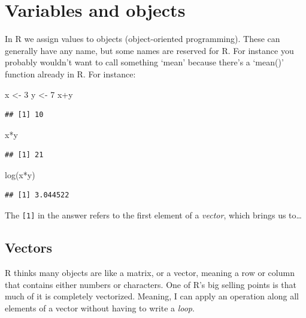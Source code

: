 \documentclass[
]{book}
\newenvironment{Shaded}{\begin{snugshade}}{\end{snugshade}}
\newcommand{\DecValTok}[1]{\textcolor[rgb]{0.00,0.00,0.81}{#1}}
\newcommand{\FunctionTok}[1]{\textcolor[rgb]{0.00,0.00,0.00}{#1}}
\newcommand{\NormalTok}[1]{#1}
\newcommand{\OtherTok}[1]{\textcolor[rgb]{0.56,0.35,0.01}{#1}}
\newcommand{\SpecialCharTok}[1]{\textcolor[rgb]{0.00,0.00,0.00}{#1}}
\begin{document}
\hypertarget{variables-and-objects}{%
\section{Variables and objects}\label{variables-and-objects}}

In R we assign values to objects (object-oriented programming). These
can generally have any name, but some names are reserved for R. For
instance you probably wouldn't want to call something `mean' because
there's a `mean()' function already in R. For instance:

\begin{Shaded}
\begin{Highlighting}[]
\NormalTok{x }\OtherTok{\textless{}{-}} \DecValTok{3}
\NormalTok{y }\OtherTok{\textless{}{-}} \DecValTok{7}
\NormalTok{x}\SpecialCharTok{+}\NormalTok{y}
\end{Highlighting}
\end{Shaded}

\begin{verbatim}
## [1] 10
\end{verbatim}

\begin{Shaded}
\begin{Highlighting}[]
\NormalTok{x}\SpecialCharTok{*}\NormalTok{y}
\end{Highlighting}
\end{Shaded}

\begin{verbatim}
## [1] 21
\end{verbatim}

\begin{Shaded}
\begin{Highlighting}[]
\FunctionTok{log}\NormalTok{(x}\SpecialCharTok{*}\NormalTok{y)}
\end{Highlighting}
\end{Shaded}

\begin{verbatim}
## [1] 3.044522
\end{verbatim}

The \texttt{{[}1{]}} in the answer refers to the first element of a \emph{vector}, which
brings us to\ldots{}

\hypertarget{vectors}{%
\subsection{Vectors}\label{vectors}}

R thinks many objects are like a matrix, or a vector, meaning a row or
column that contains either numbers or characters. One of R's big
selling points is that much of it is completely vectorized. Meaning, I
can apply an operation along all elements of a vector without having to
write a \emph{loop}.
\end{document}
